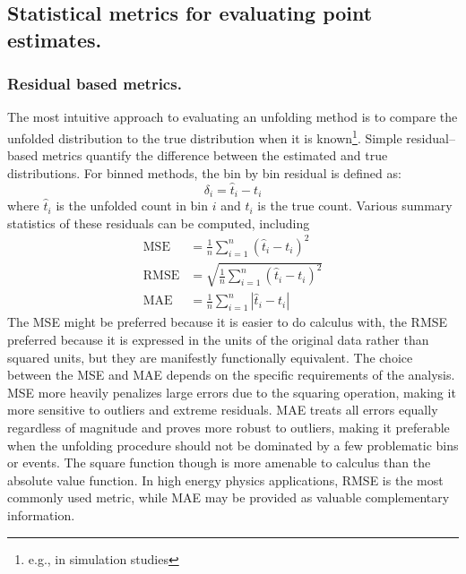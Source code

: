     
    \subsection{Statistical metrics for evaluating point estimates.}
        \subsubsection{Residual based metrics.}
            The most intuitive approach to evaluating an unfolding method is to compare the unfolded distribution to the true distribution when it is known\footnote{e.g., in simulation studies}.
            Simple residual--based metrics quantify the difference between the estimated and true distributions.
            For binned methods, the bin by bin residual is defined as:
            \begin{equation}
                \delta_i = \hat{t}_i - t_i
            \end{equation}
            where \(\hat{t}_i\) is the unfolded count in bin \(i\) and \(t_i\) is the true count.
            Various summary statistics of these residuals can be computed, including
            \begin{align}
                \text{MSE} &= \frac{1}{n}\sum_{i=1}^{n}(\hat{t}_i - t_i)^2\\
                \text{RMSE} &= \sqrt{\frac{1}{n}\sum_{i=1}^{n}(\hat{t}_i - t_i)^2}\\
                \text{MAE} &= \frac{1}{n}\sum_{i=1}^{n}|\hat{t}_i - t_i|
            \end{align}
            The MSE might be preferred because it is easier to do calculus with, the RMSE preferred because it is expressed in the units of the original data rather than squared units, but they are manifestly functionally equivalent.
            The choice between the MSE and MAE depends on the specific requirements of the analysis.
            MSE more heavily penalizes large errors due to the squaring operation, making it more sensitive to outliers and extreme residuals.
            MAE treats all errors equally regardless of magnitude and proves more robust to outliers, making it preferable when the unfolding procedure should not be dominated by a few problematic bins or events.
            The square function though is more amenable to calculus than the absolute value function.
            In high energy physics applications, RMSE is the most commonly used metric, while MAE may be provided as valuable complementary information.
            
